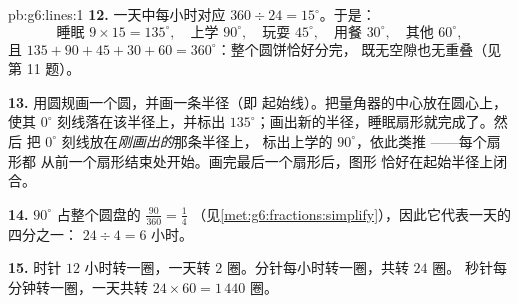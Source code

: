 \begin{solution}{pb:g6:lines:1}
\textbf{12.} 一天中每小时对应
$360 \div 24 = 15^\circ$。于是：
\[
\text{睡眠 } 9 \times 15 = 135^\circ, \quad
\text{上学 } 90^\circ, \quad
\text{玩耍 } 45^\circ, \quad
\text{用餐 } 30^\circ, \quad
\text{其他 } 60^\circ,
\]
且 $135 + 90 + 45 + 30 + 60 = 360^\circ$：整个圆饼恰好分完，
既无空隙也无重叠（见第 11 题）。

\textbf{13.} 用圆规画一个圆，并画一条半径（即
起始线）。把量角器的中心放在圆心上，
使其 $0^\circ$ 刻线落在该半径上，并标出
$135^\circ$；画出新的半径，睡眠扇形就完成了。然后
把 $0^\circ$ 刻线放在\emph{刚画出的}那条半径上，
标出上学的 $90^\circ$，依此类推 ——每个扇形都
从前一个扇形结束处开始。画完最后一个扇形后，图形
恰好在起始半径上闭合。

\textbf{14.} $90^\circ$ 占整个圆盘的 $\frac{90}{360} = \frac14$
（见\cref{met:g6:fractions:simplify}），因此它代表一天的四分之一：
$24 \div 4 = 6$ 小时。

\textbf{15.} 时针 $12$ 小时转一圈，一天转 $2$
圈。分针每小时转一圈，共转 $24$ 圈。
秒针每分钟转一圈，一天共转 $24 \times 60 = 1\,440$
圈。
\end{solution}
